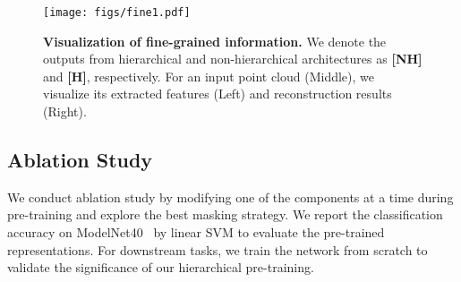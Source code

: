\documentclass{article}
\makeatletter
\newcommand\figcaption{\def\@captype{figure}\caption}
\makeatother
\begin{document}
\begin{figure*}[t!]
  \centering
    \texttt{[image: figs/fine1.pdf]}
    \vspace{-0.2cm}
   \figcaption{\textbf{Visualization of fine-grained information.} We denote the outputs from hierarchical and non-hierarchical architectures as \textbf{[NH]} and \textbf{[H]}, respectively.
   For an input point cloud (Middle), we visualize its extracted features (Left) and reconstruction results (Right).}
    \label{f6}
\vspace{-0.2cm}
\end{figure*}

\subsection{Ablation Study}
\label{ablation}
 We conduct ablation study by modifying one of the components at a time during pre-training and explore the best masking strategy. We report the classification accuracy on ModelNet40~\cite{modelnet40} by linear SVM to evaluate the pre-trained representations. For downstream tasks, we train the network from scratch to validate the significance of our hierarchical pre-training.
\end{document}
